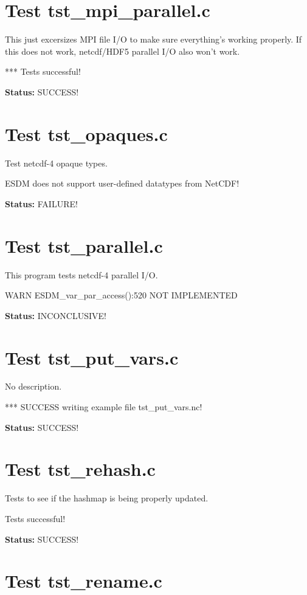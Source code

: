 \section{Test tst\_mpi\_parallel.c}

This just excersizes MPI file I/O to make sure everything's working properly. If this does not work, netcdf/HDF5 parallel I/O also won't work.

*** Tests successful!

{\bf \large Status: } SUCCESS!

\section{Test tst\_opaques.c}

Test netcdf-4 opaque types.

ESDM does not support user-defined datatypes from NetCDF!

{\bf \large Status: } FAILURE!

\section{Test tst\_parallel.c}

This program tests netcdf-4 parallel I/O.

WARN ESDM\_var\_par\_access():520 NOT IMPLEMENTED

{\bf \large Status: } INCONCLUSIVE!

\section{Test tst\_put\_vars.c}

No description.

*** SUCCESS writing example file tst\_put\_vars.nc!

{\bf \large Status: } SUCCESS!

\section{Test tst\_rehash.c}

Tests to see if the hashmap is being properly updated.

Tests successful!

{\bf \large Status: } SUCCESS!

\section{Test tst\_rename.c}


